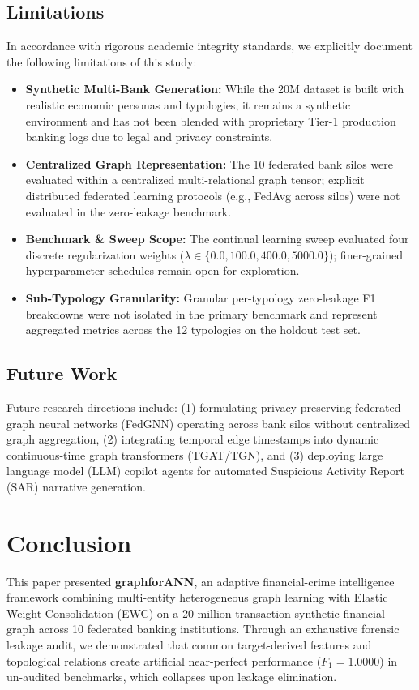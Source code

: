 \documentclass[conference]{IEEEtran}
\begin{document}
\subsection{Limitations}
In accordance with rigorous academic integrity standards, we explicitly document the following limitations of this study:
\begin{itemize}
    \item \textbf{Synthetic Multi-Bank Generation:} While the 20M dataset is built with realistic economic personas and typologies, it remains a synthetic environment and has not been blended with proprietary Tier-1 production banking logs due to legal and privacy constraints.
    \item \textbf{Centralized Graph Representation:} The 10 federated bank silos were evaluated within a centralized multi-relational graph tensor; explicit distributed federated learning protocols (e.g., FedAvg across silos) were not evaluated in the zero-leakage benchmark.
    \item \textbf{Benchmark \& Sweep Scope:} The continual learning sweep evaluated four discrete regularization weights ($\lambda \in \{0.0, 100.0, 400.0, 5000.0\}$); finer-grained hyperparameter schedules remain open for exploration.
    \item \textbf{Sub-Typology Granularity:} Granular per-typology zero-leakage F1 breakdowns were not isolated in the primary benchmark and represent aggregated metrics across the 12 typologies on the holdout test set.
\end{itemize}

\subsection{Future Work}
Future research directions include: (1) formulating privacy-preserving federated graph neural networks (FedGNN) operating across bank silos without centralized graph aggregation, (2) integrating temporal edge timestamps into dynamic continuous-time graph transformers (TGAT/TGN), and (3) deploying large language model (LLM) copilot agents for automated Suspicious Activity Report (SAR) narrative generation.

\section{Conclusion}
\label{sec:conclusion}

This paper presented \textbf{graphforANN}, an adaptive financial-crime intelligence framework combining multi-entity heterogeneous graph learning with Elastic Weight Consolidation (EWC) on a 20-million transaction synthetic financial graph across 10 federated banking institutions. Through an exhaustive forensic leakage audit, we demonstrated that common target-derived features and topological relations create artificial near-perfect performance ($F_1 = 1.0000$) in un-audited benchmarks, which collapses upon leakage elimination. 
\end{document}
